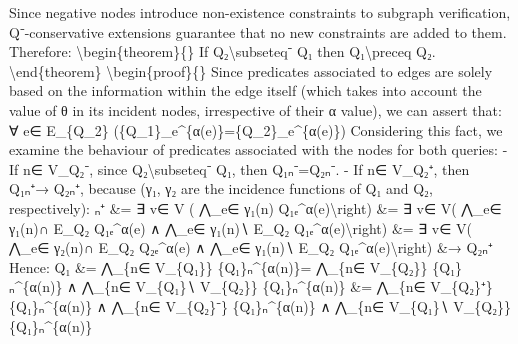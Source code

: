 \documentclass{article}%
\begin{document}
\newline%
Since negative nodes introduce non{-}existence constraints to subgraph verification, Q⁻{-}conservative extensions guarantee that no new constraints are added to them. Therefore:\newline%
\newline%
\textbackslash{}begin\{theorem\}\{\}\newline%
If Q₂\textbackslash{}subseteq⁻ Q₁ then Q₁\textbackslash{}preceq Q₂.\newline%
\textbackslash{}end\{theorem\}\newline%
\textbackslash{}begin\{proof\}\{\}\newline%
Since predicates associated to edges are solely based on the information within the edge itself (which takes into account the value of θ in its incident nodes, irrespective of their α value), we can assert that:\newline%
∀ e∈ E\_\{Q\_2\} (\{Q\_1\}\_e\^{}\{α(e)\}=\{Q\_2\}\_e\^{}\{α(e)\})\newline%
\newline%
Considering this fact, we examine the behaviour of predicates associated with the nodes for both queries:\newline%
\newline%
{-} If n∈ V\_Q₂⁻, since Q₂\textbackslash{}subseteq⁻ Q₁, then Q₁ₙ⁻=Q₂ₙ⁻.\newline%
{-} If n∈ V\_Q₂⁺, then Q₁ₙ⁺→ Q₂ₙ⁺, because (γ₁, γ₂ are the incidence functions of Q₁ and Q₂, respectively):\newline%
ₙ⁺ \&= ∃ v∈ V ( ⋀\_e∈ γ₁(n) Q₁ₑ\^{}α(e)\textbackslash{}right)\newline%
\&= ∃ v∈ V( ⋀\_e∈ γ₁(n)∩ E\_Q₂ Q₁ₑ\^{}α(e) ∧ ⋀\_e∈ γ₁(n)∖ E\_Q₂ Q₁ₑ\^{}α(e)\textbackslash{}right)\newline%
\&= ∃ v∈ V( ⋀\_e∈ γ₂(n)∩ E\_Q₂ Q₂ₑ\^{}α(e) ∧ ⋀\_e∈ γ₁(n)∖ E\_Q₂ Q₁ₑ\^{}α(e)\textbackslash{}right)\newline%
\&→ Q₂ₙ⁺\newline%
\newline%
Hence:\newline%
\newline%
Q₁ \&= ⋀\_\{n∈ V\_\{Q₁\}\} \{Q₁\}ₙ\^{}\{α(n)\}= ⋀\_\{n∈ V\_\{Q₂\}\} \{Q₁\}ₙ\^{}\{α(n)\} ∧ ⋀\_\{n∈ V\_\{Q₁\}∖ V\_\{Q₂\}\} \{Q₁\}ₙ\^{}\{α(n)\}\newline%
\newline%
\&= ⋀\_\{n∈ V\_\{Q₂\}⁺\} \{Q₁\}ₙ\^{}\{α(n)\} ∧ ⋀\_\{n∈ V\_\{Q₂\}⁻\} \{Q₁\}ₙ\^{}\{α(n)\} ∧ ⋀\_\{n∈ V\_\{Q₁\}∖ V\_\{Q₂\}\} \{Q₁\}ₙ\^{}\{α(n)\}\newline%
\end{document}

